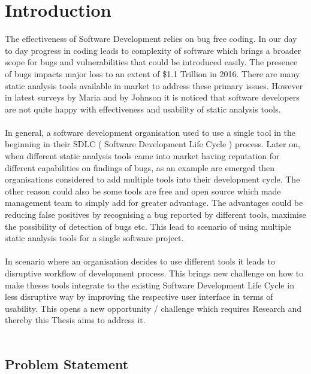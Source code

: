 \chapter{Introduction}
\label{ch:introduction}

The effectiveness of Software Development relies on bug free coding. In our day to day progress in coding leads to complexity of software which brings a broader scope for bugs and vulnerabilities that could be introduced easily. The presence of bugs impacts major loss to an extent of  \$1.1 Trillion in 2016. \cite{report} There are many static analysis tools available in market to address these primary issues. However in latest surveys by Maria \etal{} \cite{CB16} and by Johnson \etal{} \cite{JSMB13} it is noticed that software developers are not quite happy with effectiveness and usability of static analysis tools.
\\ \\

In general, a software development organisation used to use a single tool in the beginning in their SDLC ( Software Development Life Cycle ) process. Later on, when different static analysis tools came into market having reputation for different capabilities on findings of bugs, as an example are emerged then organisations considered to add multiple tools into their development cycle. The other reason could also be some tools are free and open source which made management team to simply add for greater advantage. The advantages could be reducing false positives by recognising a bug reported by different tools, maximise the possibility of detection of bugs etc. This lead to scenario of using multiple static analysis tools for a single software project.
\\ \\

In scenario where an organisation decides to use different tools it leads to disruptive workflow of development process. This brings new challenge on how to make theses tools integrate to the existing Software Development Life Cycle in less disruptive way by improving the respective user interface in terms of usability. This opens a new opportunity / challenge which requires Research and thereby this Thesis aims to address it.
\\ \\

\section{Problem Statement}

